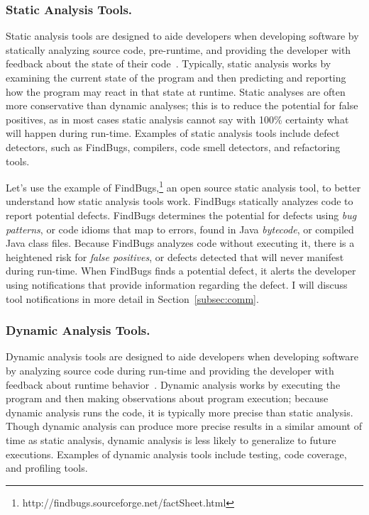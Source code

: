\documentclass{llncs}
\begin{document}
\subsubsection{Static Analysis Tools.}

Static analysis tools are designed to aide developers when developing software by statically analyzing source code, pre-runtime, and providing the developer with feedback about the state of their code~\cite{ernst2003static}.
Typically, static analysis works by examining the current state of the program and then predicting and reporting how the program may react in that state at runtime. Static analyses are often more conservative than dynamic analyses; this is to reduce the potential for false positives, as in most cases static analysis cannot say with 100\% certainty what will happen during run-time. 
Examples of static analysis tools include defect detectors, such as FindBugs, compilers, code smell detectors, and refactoring tools.

Let's use the example of FindBugs,\footnote{http://findbugs.sourceforge.net/factSheet.html} an open source static analysis tool, to better understand how static analysis tools work. FindBugs statically analyzes code to report potential defects. FindBugs determines the potential for defects using \emph{bug patterns}, or code idioms that map to errors, found in Java \emph{bytecode}, or compiled Java class files. Because FindBugs analyzes code without executing it, there is a heightened risk for \emph{false positives}, or defects detected that will never manifest during run-time. When FindBugs finds a potential defect, it alerts the developer using notifications that provide information regarding the defect. I will discuss tool notifications in more detail in Section~\ref{subsec:comm}.


\subsubsection{Dynamic Analysis Tools.}

Dynamic analysis tools are designed to aide developers when developing software by analyzing source code during run-time and providing the developer with feedback about runtime behavior~\cite{ernst2003static}.
Dynamic analysis works by executing the program and then making observations about program execution; because dynamic analysis runs the code, it is typically more precise than static analysis. Though dynamic analysis can produce more precise results in a similar amount of time as static analysis, dynamic analysis is less likely to generalize to future executions.
Examples of dynamic analysis tools include testing, code coverage, and profiling tools.
\end{document}
